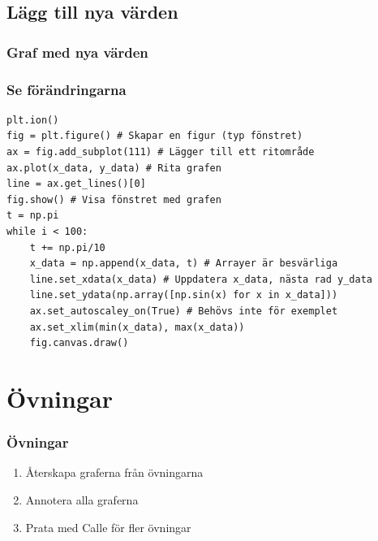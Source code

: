 \documentclass[aspectratio=169]{beamer}
\begin{document}
\subsection{Lägg till nya värden}

\begin{frame}
	\frametitle{Graf med nya värden}
	
	\centering
	
\end{frame}

\begin{frame}[fragile]
	\frametitle{Se förändringarna}
	
	\begin{lstlisting}
plt.ion()
fig = plt.figure() # Skapar en figur (typ fönstret)
ax = fig.add_subplot(111) # Lägger till ett ritområde
ax.plot(x_data, y_data) # Rita grafen
line = ax.get_lines()[0]
fig.show() # Visa fönstret med grafen
t = np.pi
while i < 100:
    t += np.pi/10
    x_data = np.append(x_data, t) # Arrayer är besvärliga
    line.set_xdata(x_data) # Uppdatera x_data, nästa rad y_data
    line.set_ydata(np.array([np.sin(x) for x in x_data]))
    ax.set_autoscaley_on(True) # Behövs inte för exemplet
    ax.set_xlim(min(x_data), max(x_data))
    fig.canvas.draw()
	\end{lstlisting}
	
\end{frame}

\section{Övningar}

\begin{frame}
	\frametitle{Övningar}
	
	\begin{enumerate}
		\item Återskapa graferna från övningarna
		\item Annotera alla graferna
		\item Prata med Calle för fler övningar
	\end{enumerate}

\end{frame}
\end{document}
